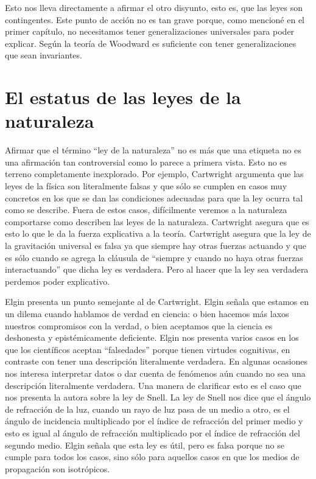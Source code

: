 Esto nos lleva directamente a afirmar el otro disyunto, esto es, que las leyes son contingentes. Este punto de acción no es tan grave porque, como mencioné en el primer capítulo, no necesitamos tener generalizaciones universales para poder explicar. Según la teoría de Woodward es suficiente con tener generalizaciones que sean invariantes.

\section{El estatus de las leyes de la naturaleza}

\noindent Afirmar que el término ``ley de la naturaleza'' no es más que una etiqueta no es una afirmación tan controversial como lo parece a primera vista. Esto no es terreno completamente inexplorado. Por ejemplo, Cartwright \citeyear{Cartwright1983} argumenta que las leyes de la física son literalmente falsas y que sólo se cumplen en casos muy concretos en los que se dan las condiciones adecuadas para que la ley ocurra tal como se describe. Fuera de estos casos, difícilmente veremos a la naturaleza comportarse como describen las leyes de la naturaleza. Cartwright asegura que es esto lo que le da la fuerza explicativa a la teoría. Cartwright asegura que la ley de la gravitación universal es falsa ya que siempre hay otras fuerzas actuando y que es sólo cuando se agrega la cláusula de ``siempre y cuando no haya otras fuerzas interactuando'' que dicha ley es verdadera. Pero al hacer que la ley sea verdadera perdemos poder explicativo.

Elgin presenta un punto semejante al de Cartwright. Elgin \citeyear{Elgin2004} señala que estamos en un dilema cuando hablamos de verdad en ciencia: o bien hacemos más laxos nuestros compromisos con la verdad, o bien aceptamos que la ciencia es deshonesta y epistémicamente deficiente. Elgin nos presenta varios casos en los que los científicos aceptan ``falsedades'' porque tienen virtudes cognitivas, en contraste con tener una descripción literalmente verdadera. En algunas ocasiones nos interesa interpretar datos o dar cuenta de fenómenos aún cuando no sea una descripción literalmente verdadera. Una manera de clarificar esto es el caso que nos presenta la autora sobre la ley de Snell. La ley de Snell nos dice que el ángulo de refracción de la luz, cuando un rayo de luz pasa de un medio a otro, es el ángulo de incidencia multiplicado por el índice de refracción del primer medio y esto es igual al ángulo de refracción multiplicado por el índice de refracción del segundo medio. Elgin señala que esta ley es útil, pero es falsa porque no se cumple para todos los casos, sino sólo para aquellos casos en que los medios de propagación son isotrópicos.

